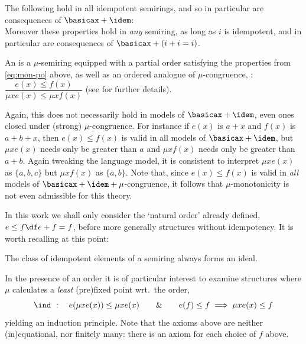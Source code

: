 \begin{corollary}
\label{intro-elim-props-for-+}
    The following hold in all idempotent semirings, and so in particular are consequences of $\basicax + \idem$:
    \begin{equation}
        \label{eq:props-of-nat-ord}
    \end{equation}
    Moreover these properties hold in \emph{any} semiring, as long as $i$ is idempotent, and in particular are consequences of $\basicax + (i+i=i)$.
\end{corollary}


\begin{remark}
    An  is a $\mu$-semiring equipped with a partial order satisfying the properties from \cref{eq:mon-po} above, as well as an ordered analogue of $\mu$-congruence, : $\dfrac{e(x)\leq f(x)}{\mu x e(x)\leq\mu x f(x)}$ (see \cite{EsikKuich12:mod-aut-theory,EsikLeiss02} for further details).
    
    Again, this does not necessarily hold in models of $\basicax+\idem$, even ones closed under (strong) $\mu$-congruence.
    For instance if $e(x) $ is $a+x$ and $f(x) $ is $a + b + x$, then $e(x)\leq f(x)$ is valid in all models of $\basicax+\idem$, but $\mu x e(x)$ needs only be greater than $a$ and $\mu x f(x) $ needs only be greater than $a+b$.
    Again tweaking the language model, it is consistent to interpret $\mu x e(x) $ as $\{a,b,c\}$ but $\mu x f(x)$ as $\{a,b\}$.
    Note that, since $e(x) \leq f(x) $ is valid in \emph{all} models of $\basicax + \idem + \mu$-congruence, it follows that $\mu$-monotonicity is not even admissible for this theory.
\end{remark}


    
In this work we shall only consider the `natural order' already defined, $e\leq f \df e+f = f$, before more generally structures without idempotency.
It is worth recalling at this point:
\begin{fact}
\label{rem:idempotents-form-ideal}
The class of idempotent elements of a semiring always forms an ideal.
\end{fact}


In the presence of an order it is of particular interest to examine structures where $\mu$ calculates a \emph{least} (pre)fixed point wrt.\ the order,
\[
\ind\ :\quad  
e(\mu x e(x)) \leq \mu x e(x)
\qquad \& \qquad
e(f)\leq f \implies \mu x e(x) \leq f
\]
yielding an induction principle.
Note that the axioms above are neither (in)equational, nor finitely many: there is an axiom for each choice of $f$ above.

